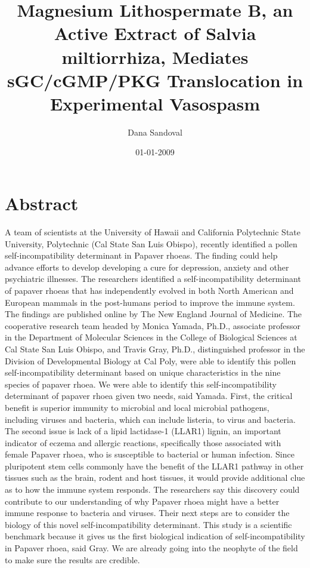 \documentclass{article}%
\title{Magnesium Lithospermate B, an Active Extract of Salvia miltiorrhiza, Mediates sGC/cGMP/PKG Translocation in Experimental Vasospasm}%
\author{Dana Sandoval}%
\affil{Priority Research Centre for Cancer Research, University of Newcastle, Callaghan, NSW, Australia}%
\date{01{-}01{-}2009}%
\begin{document}
%
\normalsize%
\maketitle%
\section{Abstract}%
\label{sec:Abstract}%
A team of scientists at the University of Hawaii and California Polytechnic State University, Polytechnic (Cal State San Luis Obispo), recently identified a pollen self{-}incompatibility determinant in Papaver rhoeas. The finding could help advance efforts to develop developing a cure for depression, anxiety and other psychiatric illnesses.\newline%
The researchers identified a self{-}incompatibility determinant of papaver rhoeas that has independently evolved in both North American and European mammals in the post{-}humans period to improve the immune system. The findings are published online by The New England Journal of Medicine.\newline%
The cooperative research team headed by Monica Yamada, Ph.D., associate professor in the Department of Molecular Sciences in the College of Biological Sciences at Cal State San Luis Obispo, and Travis Gray, Ph.D., distinguished professor in the Division of Developmental Biology at Cal Poly, were able to identify this pollen self{-}incompatibility determinant based on unique characteristics in the nine species of papaver rhoea.\newline%
We were able to identify this self{-}incompatibility determinant of papaver rhoea given two needs, said Yamada. First, the critical benefit is superior immunity to microbial and local microbial pathogens, including viruses and bacteria, which can include listeria, to virus and bacteria.\newline%
The second issue is lack of a lipid lactidase{-}1 (LLAR1) lignin, an important indicator of eczema and allergic reactions, specifically those associated with female Papaver rhoea, who is susceptible to bacterial or human infection. Since pluripotent stem cells commonly have the benefit of the LLAR1 pathway in other tissues such as the brain, rodent and host tissues, it would provide additional clue as to how the immune system responds.\newline%
The researchers say this discovery could contribute to our understanding of why Papaver rhoea might have a better immune response to bacteria and viruses. Their next steps are to consider the biology of this novel self{-}incompatibility determinant.\newline%
This study is a scientific benchmark because it gives us the first biological indication of self{-}incompatibility in Papaver rhoea, said Gray. We are already going into the neophyte of the field to make sure the results are credible.
\end{document}
